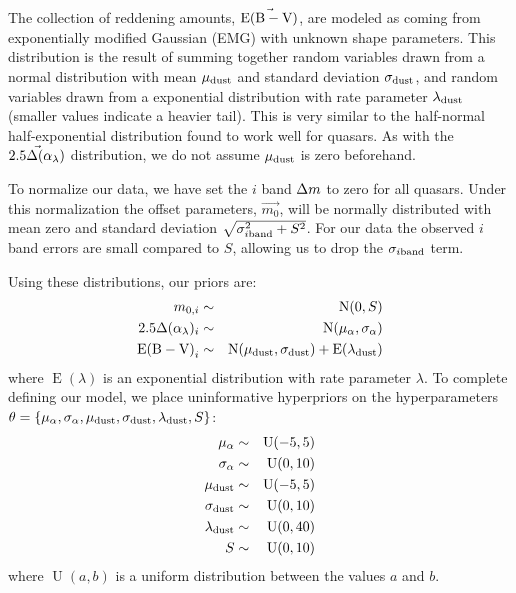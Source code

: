 The collection of reddening amounts, $\vec{{\rm E(B-V)}}$, are modeled as coming from exponentially modified Gaussian (EMG) with unknown shape parameters. This distribution is the result of summing together random variables drawn from a normal distribution with mean $\mu_{\rm dust}$ and standard deviation $\sigma_{\rm dust}$, and random variables drawn from a exponential distribution with rate parameter $\lambda_{\rm dust}$ (smaller values indicate a heavier tail). This is very similar to the half-normal half-exponential distribution \citet{Hopkins:2004} found to work well for quasars. As with the $\vec{2.5\Delta(\alpha_{\lambda})}$ distribution, we do not assume $\mu_{\rm dust}$ is zero beforehand.

To normalize our data, we have set the $i$ band $\Delta m$ to zero for all quasars. Under this normalization the offset parameters, $\vec{m_0}$, will be normally distributed with mean zero and standard deviation $\sqrt{\sigma_{i{\rm  band}}^2+S^2}$. For our data the observed $i$ band errors are small compared to $S$, allowing us to drop the $\sigma_{i{\rm  band}}$ term.

Using these distributions, our priors are:
\begin{eqnarray} \label{eqn:priors}
 m_{0,i} &\sim& \operatorname{N}(0,S) \nonumber \\
 2.5\dal_{i} &\sim& \operatorname{N}(\mu_{\alpha},\sigma_{\alpha}) \\
 \ebv_{i} &\sim& \operatorname{N}(\mu_{\rm dust},\sigma_{\rm dust}) + \operatorname{E}(\lambda_{\rm dust}) \nonumber 
\end{eqnarray}
where $\operatorname{E}(\lambda)$ is an exponential distribution with rate parameter $\lambda$.
To complete defining our model, we place uninformative hyperpriors on the hyperparameters $\theta=\{ \mu_{\alpha},\sigma_{\alpha},\mu_{\rm dust},\sigma_{\rm dust},\lambda_{\rm dust},S \}$:
\begin{eqnarray} \label{eqn:h_priors}
 \mu_{\alpha} &\sim& \operatorname{U}(-5,5) \nonumber \\
 \sigma_{\alpha} &\sim& \operatorname{U}(0,10) \nonumber \\
 \mu_{\rm dust} &\sim& \operatorname{U}(-5,5) \\
 \sigma_{\rm dust} &\sim& \operatorname{U}(0,10) \nonumber \\
 \lambda_{\rm dust} &\sim& \operatorname{U}(0,40) \nonumber \\
 S &\sim& \operatorname{U}(0,10) \nonumber
\end{eqnarray}
where $\operatorname{U}(a,b)$ is a uniform distribution between the values $a$ and $b$.

